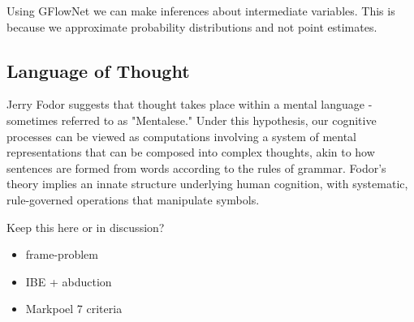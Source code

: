



Using GFlowNet we can make inferences about intermediate variables. This is because we approximate probability distributions and not point estimates.



\subsection{Language of Thought}

Jerry Fodor suggests that thought takes place within a mental language - sometimes referred to as "Mentalese." Under this hypothesis, our cognitive processes can be viewed as computations involving a system of mental representations that can be composed into complex thoughts, akin to how sentences are formed from words according to the rules of grammar. Fodor's theory implies an innate structure underlying human cognition, with systematic, rule-governed operations that manipulate symbols.


Keep this here or in discussion?
\begin{itemize}
    \item frame-problem
    \item IBE + abduction
    \item Markpoel 7 criteria
\end{itemize}
















